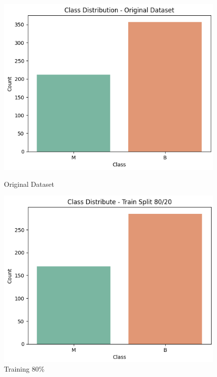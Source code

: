 \begin{figure}[h!]
	\centering
	\begin{minipage}[b]{0.32\linewidth}
		\centering
		\includegraphics[width=\linewidth]{figures/dataset1/3.1.png}
		\caption{Original Dataset}
		\label{fig:original_2}
	\end{minipage}%
	\hfill
	\begin{minipage}[b]{0.32\linewidth}
		\centering
		\includegraphics[width=\linewidth]{figures/dataset1/3.2.png}
		\caption{Training 80\%}
		\label{fig:train80}
	\end{minipage}%
	\hfill
	\begin{minipage}[b]{0.32\linewidth}

\end{minipage}
\end{figure}
